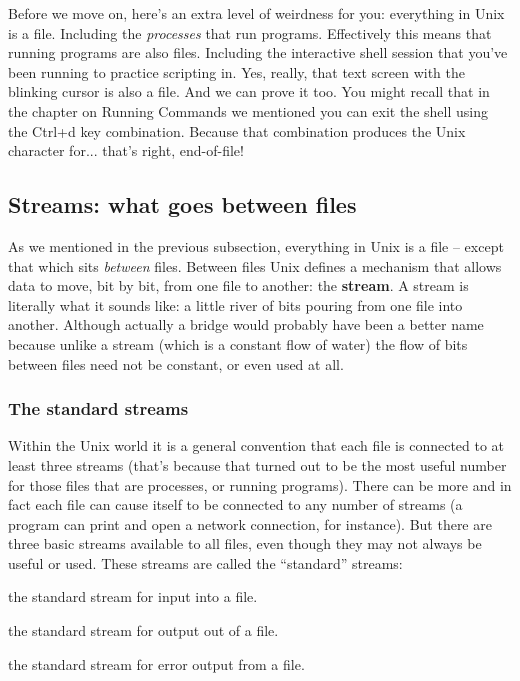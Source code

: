 Before we move on, here's an extra level of weirdness for you: everything in
Unix is a file. Including the \emph{processes} that run programs. Effectively
this means that running programs are also files. Including the interactive
shell session that you've been running to practice scripting in. Yes, really,
that text screen with the blinking cursor is also a file. And we can prove it
too. You might recall that in the chapter on Running Commands we mentioned you
can exit the shell using the Ctrl+d key combination.  Because that combination
produces the Unix character for... that's right, end-of-file!

\subsection{Streams: what goes between files}
As we mentioned in the previous subsection, everything in Unix is a file --
except that which sits \emph{between} files. Between files Unix defines a
mechanism that allows data to move, bit by bit, from one file to another: the
\textbf{stream}. A stream is literally what it sounds like: a little river of
bits pouring from one file into another. Although actually a bridge would
probably have been a better name because unlike a stream (which is a constant
flow of water) the flow of bits between files need not be constant, or even
used at all.

\subsubsection{The standard streams}
Within the Unix world it is a general convention that each file is connected to
at least three streams (that's because that turned out to be the most useful
number for those files that are processes, or running programs). There can be
more and in fact each file can cause itself to be connected to any number of
streams (a program can print and open a network connection, for instance). But
there are three basic streams available to all files, even though they may not
always be useful or used. These streams are called the ``standard'' streams:
\begin{description}
\setlength{\leftmargin}{0pt}
\setlength{\itemsep}{0pt}
\setlength{\parsep}{0pt}
\setlength{\parskip}{0pt}
	\item[Standard in (stdin)] the standard stream for input into a file.
	\item[Standard out (stdout)] the standard stream for output out of a file.
	\item[Standard error (stderr)] the standard stream for error output from a file.
\end{description}

